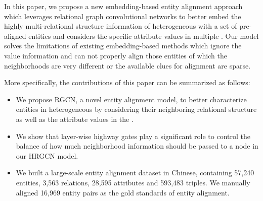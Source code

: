 	
	In this paper, we propose a new embedding-based entity alignment approach which leverages relational graph convolutional networks to better embed the highly multi-relational structure information of heterogeneous \KGs with a set of pre-aligned entities and considers the specific attribute values in multiple \KGs. Our model solves the limitations of existing embedding-based methods which ignore the value information and can not properly align those entities of which the neighborhoods are very different or the available clues for alignment are sparse.
	
	More specifically, the contributions of this paper can be summarized as follows:
	\begin{itemize}
		\item We propose RGCN, a novel entity alignment model, to better characterize entities in heterogeneous \KGs by considering their neighboring relational structure as well as the attribute values in the \KGs.
		
		\item We show that layer-wise highway gates play a significant role to control the balance of how much neighborhood information should be passed to a node in our HRGCN model.
		
		\item We built a large-scale entity alignment dataset in Chinese, containing 57,240 entities, 3,563 relations, 28,595 attributes and 593,483 triples. We manually aligned 16,969 entity pairs as the gold standards of entity alignment.
		
	\end{itemize}
